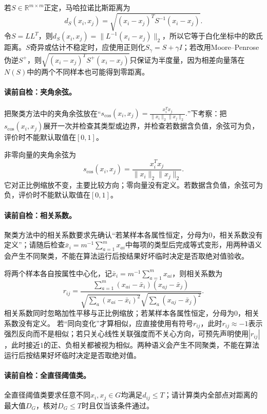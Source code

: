 若$S\in\mathbb R^{m\times m}$正定，马哈拉诺比斯距离为
\[
d_S(x_i,x_j)=\sqrt{(x_i-x_j)^TS^{-1}(x_i-x_j)}.
\]
令$S=LL^T$，则$d_S(x_i,x_j)=\|L^{-1}(x_i-x_j)\|_2$，所以它等于白化坐标中的欧氏距离。$S$奇异或估计不稳定时，应使用正则化$S_\gamma=S+\gamma I$；若改用Moore--Penrose伪逆$S^+$，则$\sqrt{(x_i-x_j)^TS^+(x_i-x_j)}$只保证为半度量，因为相差向量落在$N(S)$中的两个不同样本也可能得到零距离。

\paragraph{读前自检：夹角余弦。}把聚类方法中的夹角余弦放在“$s_{\cos}(x_i,x_j)=\frac{x_i^Tx_j}{\|x_i\|_2\|x_j\|_2}.$”下考察：把$s_{\cos}(x_i,x_j)$展开一次并检查其类型或边界，并检查若数据含负值，余弦可为负，评价时不能默认取值在$[0,1]$。\par

非零向量的夹角余弦为
\[
s_{\cos}(x_i,x_j)=\frac{x_i^Tx_j}{\|x_i\|_2\|x_j\|_2}.
\]
它对正比例缩放不变，主要比较方向；零向量没有定义。若数据含负值，余弦可为负，评价时不能默认取值在$[0,1]$。

\paragraph{读前自检：相关系数。}聚类方法中的相关系数要求先确认“若某样本各属性恒定，分母为0，相关系数没有定义”；请随后检查$\bar x_i=m^{-1}\sum_{a=1}^{m}x_{ai}$中每项的类型后完成等式变形，用两种语义会产生不同聚类，不能在算法运行后按结果好坏临时决定是否取绝对值验收。\par

将两个样本各自按属性中心化，记$\bar x_i=m^{-1}\sum_{a=1}^{m}x_{ai}$，则相关系数为
\[
r_{ij}=\frac{\sum_{a=1}^{m}(x_{ai}-\bar x_i)(x_{aj}-\bar x_j)}
{\sqrt{\sum_a(x_{ai}-\bar x_i)^2}\sqrt{\sum_a(x_{aj}-\bar x_j)^2}}.
\]
相关系数同时忽略加性平移与正比例缩放；若某样本各属性恒定，分母为0，相关系数没有定义。
若“同向变化”才算相似，应直接使用有符号$r_{ij}$，此时$r_{ij}\approx-1$表示强烈反向而不是相似；若只关心线性关联强度而不关心方向，可预先声明使用$|r_{ij}|$，此时接近$1$的正、负相关都被视为相似。两种语义会产生不同聚类，不能在算法运行后按结果好坏临时决定是否取绝对值。

\paragraph{读前自检：全直径阈值类。}全直径阈值类要求任意不同$x_i,x_j\in G$均满足$d_{ij}\le T$；请计算类内全部点对距离的最大值$D_G$，核对$D_G\le T$时且仅当该条件通过。\par
